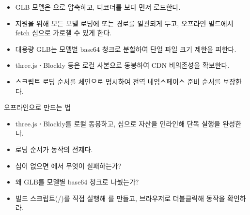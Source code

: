 \begin{infobox}[title=WebGL 자산 제작 \textbf{·} 배포 체크리스트]
\begin{itemize}
  \item GLB 모델은 으로 압축하고, 디코더를
        보다 먼저 로드한다.
  \item {} 지원을 위해 모든 모델 로딩에  또는
         경로를 일관되게 두고, 오프라인 빌드에서 fetch 심으로
        가로챌 수 있게 한다.
  \item 대용량 GLB는 모델별 base64 청크로 분할하여 단일 파일 크기 제한을 피한다.
  \item three.js\textbf{·}Blockly 등은 로컬 사본으로 동봉하여 CDN 비의존성을 확보한다.
  \item 스크립트 로딩 순서를  체인으로 명시하여 전역 네임스페이스
        준비 순서를 보장한다.
\end{itemize}
\end{infobox}

\begin{teachbox}{오프라인으로 만드는 법}
\begin{itemize}
  \item three.js\textbf{·}Blockly를 로컬 동봉하고,  심으로 자산을 인라인해  단독 실행을 완성한다.
  \item {} 로딩 순서가 동작의 전제다.
\end{itemize}
\begin{itemize}
  \item {} 심이 없으면 에서 무엇이 실패하는가?
  \item 왜 GLB를 모델별 base64 청크로 나눴는가?
\end{itemize}
\begin{itemize}
  \item 빌드 스크립트(/)를 직접 실행해 를 만들고, 브라우저로 더블클릭해 동작을 확인하라.
\end{itemize}
\end{teachbox}

